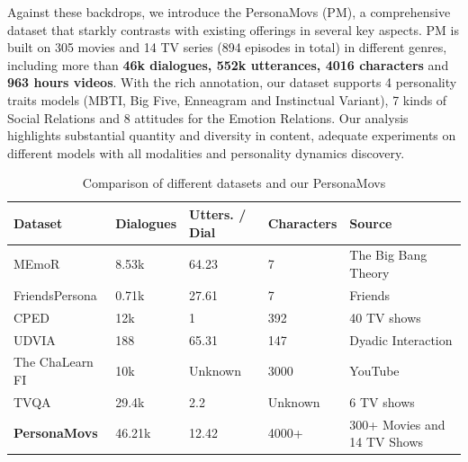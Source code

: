 Against these backdrops, we introduce the PersonaMovs (PM), a comprehensive dataset that starkly contrasts with existing offerings in several key aspects. PM is built on 305 movies and 14 TV series (894 episodes in total) in different genres, including more than \textbf{46k dialogues, 552k utterances, 4016 characters} and \textbf{963 hours videos}. With the rich annotation, our dataset supports 4 personality traits models (MBTI, Big Five, Enneagram and Instinctual Variant), 7 kinds of Social Relations and 8 attitudes for the Emotion Relations. Our analysis highlights substantial quantity and diversity in content, adequate experiments on different models with all modalities and personality dynamics discovery.

\begin{table}[h]
  \centering
  \small
  \begin{tabular}{lllll}
    \hline
    \textbf{Dataset} & \textbf{Dialogues} & \textbf{Utters. / Dial} & \textbf{Characters} & \textbf{Source}\\
    \hline
    MEmoR & 8.53k & 64.23 & 7 & The Big Bang Theory \\
    \hline
    FriendsPersona & 0.71k & 27.61 & 7 & Friends\\
    \hline
    CPED & 12k & 1 & 392 & 40 TV shows\\
    \hline
    UDVIA & 188 & 65.31 & 147 & Dyadic Interaction\\
    \hline
    The ChaLearn FI & 10k & Unknown & 3000 & YouTube\\
    \hline
    TVQA & 29.4k & 2.2 & Unknown & 6 TV shows\\
    \hline
    \textbf{PersonaMovs} & 46.21k & 12.42 & 4000+ & 300+ Movies and 14 TV Shows\\
    \hline
  \end{tabular}
  \caption{Comparison of different datasets and our PersonaMovs}
  \label{tab:accents}
\end{table}

